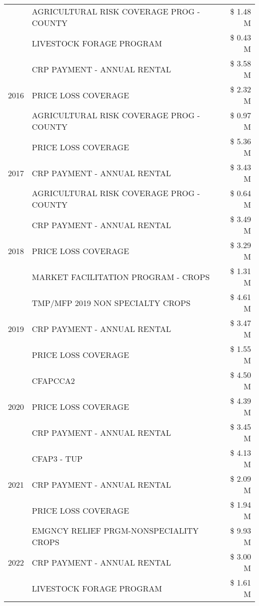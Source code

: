 \begin{tabular}{llr}
 & AGRICULTURAL RISK COVERAGE PROG - COUNTY & \$ 1.48 M \\
 & LIVESTOCK FORAGE PROGRAM & \$ 0.43 M \\
\cline{1-3}
\multirow[t]{3}{*}{2016} & CRP PAYMENT - ANNUAL RENTAL & \$ 3.58 M \\
 & PRICE LOSS COVERAGE & \$ 2.32 M \\
 & AGRICULTURAL RISK COVERAGE PROG - COUNTY & \$ 0.97 M \\
\cline{1-3}
\multirow[t]{3}{*}{2017} & PRICE LOSS COVERAGE & \$ 5.36 M \\
 & CRP PAYMENT - ANNUAL RENTAL & \$ 3.43 M \\
 & AGRICULTURAL RISK COVERAGE PROG - COUNTY & \$ 0.64 M \\
\cline{1-3}
\multirow[t]{3}{*}{2018} & CRP PAYMENT - ANNUAL RENTAL & \$ 3.49 M \\
 & PRICE LOSS COVERAGE & \$ 3.29 M \\
 & MARKET FACILITATION PROGRAM - CROPS & \$ 1.31 M \\
\cline{1-3}
\multirow[t]{3}{*}{2019} & TMP/MFP 2019 NON SPECIALTY CROPS & \$ 4.61 M \\
 & CRP PAYMENT - ANNUAL RENTAL & \$ 3.47 M \\
 & PRICE LOSS COVERAGE & \$ 1.55 M \\
\cline{1-3}
\multirow[t]{3}{*}{2020} & CFAPCCA2 & \$ 4.50 M \\
 & PRICE LOSS COVERAGE & \$ 4.39 M \\
 & CRP PAYMENT - ANNUAL RENTAL & \$ 3.45 M \\
\cline{1-3}
\multirow[t]{3}{*}{2021} & CFAP3 - TUP & \$ 4.13 M \\
 & CRP PAYMENT - ANNUAL RENTAL & \$ 2.09 M \\
 & PRICE LOSS COVERAGE & \$ 1.94 M \\
\cline{1-3}
\multirow[t]{3}{*}{2022} & EMGNCY RELIEF PRGM-NONSPECIALITY CROPS & \$ 9.93 M \\
 & CRP PAYMENT - ANNUAL RENTAL & \$ 3.00 M \\
 & LIVESTOCK FORAGE PROGRAM & \$ 1.61 M \\
\cline{1-3}
\bottomrule
\end{tabular}

